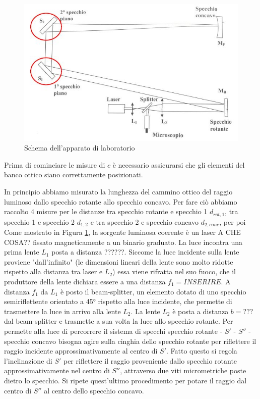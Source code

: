 \documentclass{article}
\begin{document}
\begin{figure}[h] %
    \centering
    \includegraphics[width=0.6\linewidth]{Progettazione1.JPG}
    \caption{Schema dell'apparato di laboratorio}
    \label{schema_apparato}
\end{figure}

Prima di cominciare le misure di $c$ è necessario assicurarsi che gli elementi del banco ottico siano correttamente posizionati.

\vspace{3mm}

In principio abbiamo misurato la lunghezza del cammino ottico del raggio luminoso dallo specchio rotante allo specchio concavo. Per fare ciò abbiamo raccolto 4 misure
per le distanze tra specchio rotante e specchio 1 $d_{rot,1}$, tra specchio 1 e specchio 2 $d_{1,2}$ e tra specchio 2 e specchio concavo $d_{2,conc}$, per poi
Come mostrato in Figura \ref{schema_apparato}, la sorgente luminosa coerente è un laser A CHE COSA?? fissato magneticamente a un binario graduato. La luce incontra una 
prima lente $L_1$ posta a distanza ??????. 
Siccome la luce incidente sulla lente proviene "dall'infinito" (le dimensioni lineari della lente sono molto ridotte rispetto alla distanza tra laser e $L_2$) essa viene
rifratta nel suo fuoco, che il produttore della lente dichiara essere a una distanza $f_1 = INSERIRE$. A distanza $f_1$ da $L_1$ è posto il beam-splitter, un elemento
dotato di uno specchio semiriflettente orientato a 45° rispetto alla luce incidente, che permette di trasmettere la luce in arrivo alla lente $L_2$. La lente $L_2$ 
è posta a distanza $b = ???$ dal beam-splitter e trasmette a sua volta la luce allo specchio rotante. Per permette alla luce di percorrere il sistema di specchi specchio
rotante - $S'$ - $S''$ - specchio concavo bisogna agire sulla cinghia dello specchio rotante per riflettere il raggio incidente approssimativamente al centro di $S'$.
Fatto questo si regola l'inclinazione di $S'$ per riflettere il raggio proveniente dallo specchio rotante approssimativamente nel centro di $S''$, attraverso due
viti micrometriche poste dietro lo specchio. Si ripete quest'ultimo procedimento per potare il raggio dal centro di $S''$ al centro dello specchio concavo.
\end{document}
